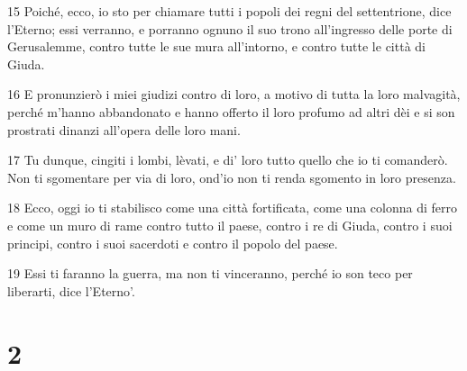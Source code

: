 \par 15 Poiché, ecco, io sto per chiamare tutti i popoli dei regni del settentrione, dice l'Eterno; essi verranno, e porranno ognuno il suo trono all'ingresso delle porte di Gerusalemme, contro tutte le sue mura all'intorno, e contro tutte le città di Giuda.
\par 16 E pronunzierò i miei giudizi contro di loro, a motivo di tutta la loro malvagità, perché m'hanno abbandonato e hanno offerto il loro profumo ad altri dèi e si son prostrati dinanzi all'opera delle loro mani.
\par 17 Tu dunque, cingiti i lombi, lèvati, e di' loro tutto quello che io ti comanderò. Non ti sgomentare per via di loro, ond'io non ti renda sgomento in loro presenza.
\par 18 Ecco, oggi io ti stabilisco come una città fortificata, come una colonna di ferro e come un muro di rame contro tutto il paese, contro i re di Giuda, contro i suoi principi, contro i suoi sacerdoti e contro il popolo del paese.
\par 19 Essi ti faranno la guerra, ma non ti vinceranno, perché io son teco per liberarti, dice l'Eterno'.

\chapter{2}

